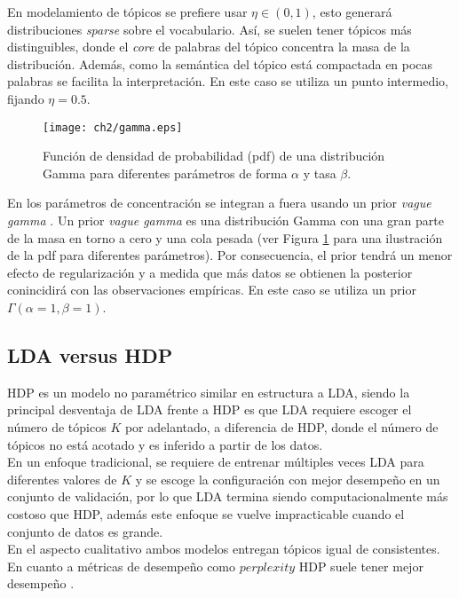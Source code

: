 \documentclass[letterpaper,12pt,oneside]{book} %
\begin{document}
En modelamiento de tópicos se prefiere usar $\eta\in (0,1)$, esto generará distribuciones \textit{sparse} sobre el vocabulario. Así, se suelen tener tópicos más distinguibles, donde el \textit{core} de palabras del tópico concentra la masa de la distribución. Además, como la semántica del tópico está compactada en pocas palabras se facilita la interpretación. En este caso se utiliza un punto intermedio, fijando $\eta=0.5$.\\ 

\begin{figure}
    \texttt{[image: ch2/gamma.eps]}
    \caption{Función de densidad de probabilidad (pdf) de una distribución Gamma para diferentes parámetros de forma $\alpha$ y tasa $\beta$.}
    \label{img:gamma}
\end{figure}


En \citep{teh2005sharing} los parámetros de concentración se integran a fuera usando un prior \textit{vague gamma} \citep{escobar1995bayesian}. Un prior \textit{vague gamma} es una distribución Gamma con una gran parte de la masa en torno a cero y una cola pesada (ver Figura \ref{img:gamma} para una ilustración de la pdf para diferentes parámetros). Por consecuencia, el prior tendrá un menor efecto de regularización y a medida que más datos se obtienen la posterior conincidirá con las observaciones empíricas. En este caso se utiliza un prior $\Gamma(\alpha=1, \beta=1)$.


\subsection{LDA versus HDP}

HDP es un modelo no paramétrico similar en estructura a LDA, siendo la principal desventaja de LDA frente a HDP es que LDA requiere escoger el número de tópicos $K$ por adelantado, a diferencia de HDP, donde el número de tópicos no está acotado y es inferido a partir de los datos. \\

En un enfoque tradicional, se requiere de entrenar múltiples veces LDA para diferentes valores de $K$ y se escoge la configuración con mejor desempeño en un conjunto de validación, por lo que LDA termina siendo computacionalmente más costoso que HDP, además este enfoque se vuelve impracticable cuando el conjunto de datos es grande. \\

En el aspecto cualitativo ambos modelos entregan tópicos igual de consistentes. En cuanto a métricas de desempeño como $\textit{perplexity}$ HDP suele tener mejor desempeño \citep{teh2005sharing}.
\end{document}
